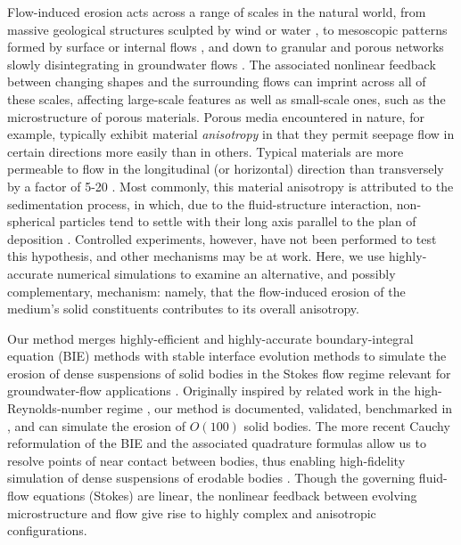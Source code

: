\documentclass[3p]{elsarticle}
\begin{document}
	Flow-induced erosion acts across a range of scales in the natural world, from massive geological structures sculpted by wind or water \cite{abrams2009growth, perkins2015amplification, mac2020ultra, sharma2022alcove, mac2022morphological}, to mesoscopic patterns formed by surface or internal flows \cite{berhanu2012shape, bertagni2021hydrodynamic, weady2022anomalous}, and down to granular and porous networks slowly disintegrating in groundwater flows \cite{szymczak2009wormhole, chiu2020viscous, zareei2022temporal}. The associated nonlinear feedback between changing shapes and the surrounding flows can imprint across all of these scales, affecting large-scale features as well as small-scale ones, such as the microstructure of porous materials. Porous media encountered in nature, for example, typically exhibit material {\em anisotropy} in that they permit seepage flow in certain directions more easily than in others. Typical materials are more permeable to flow in the longitudinal (or horizontal) direction than transversely by a factor of 5-20 \cite{bear1988dynamics, anderson2015applied}. Most commonly, this material anisotropy is attributed to the sedimentation process, in which, due to the fluid-structure interaction, non-spherical particles tend to settle with their long axis parallel to the plan of deposition \cite{bear1988dynamics}. Controlled experiments, however, have not been performed to test this hypothesis, and other mechanisms may be at work. Here, we use highly-accurate numerical simulations to examine an alternative, and possibly complementary, mechanism: namely, that the flow-induced erosion of the medium's solid constituents contributes to its overall anisotropy.

	Our method merges highly-efficient and highly-accurate boundary-integral equation (BIE) methods \cite{baker1986boundary, moore2007evaluation} with stable interface evolution methods \cite{hou-low-she1994, Moore2013} to simulate the erosion of dense suspensions of solid bodies in the Stokes flow regime relevant for groundwater-flow applications \cite{quaife2018boundary, chiu2020viscous}. Originally inspired by related work in the high-Reynolds-number regime \cite{Ristroph2012, Moore2013, Huang2015, MooreCPAM2017}, our method is documented, validated, benchmarked in \cite{quaife2018boundary}, and can simulate the erosion of $O(100)$ solid bodies. The more recent Cauchy reformulation of the BIE and the associated  quadrature formulas allow us to resolve points of near contact between bodies, thus enabling high-fidelity simulation of dense suspensions of erodable bodies \cite{chiu2020viscous}. Though the governing fluid-flow equations (Stokes) are linear, the nonlinear feedback between evolving microstructure and flow give rise to highly complex and anisotropic configurations.
	
\end{document}
